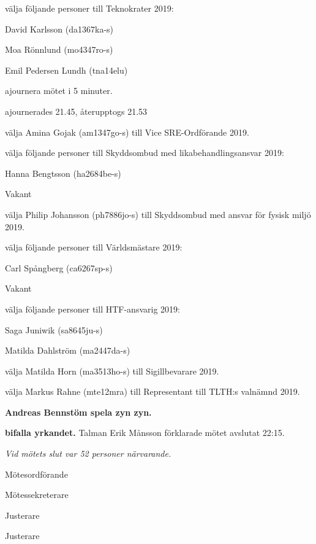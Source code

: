 \documentclass[10pt]{article}
\def\mo{Erik Månsson}
\def\ms{Axel Voss}
\def\ji{Rasmus Sobel}
\def\jii{Henrik Ramström}
\begin{document}
\begin{paragrafer}
\begin{paralist}
    \Mba välja följande personer till Teknokrater 2019:
    \begin{tightdashlist}
        \item David Karlsson (da1367ka-s)
        \item Moa Rönnlund (mo4347ro-s)
        \item Emil Pedersen Lundh (tna14elu)
    \end{tightdashlist}

    \Mba ajournera mötet i 5 minuter. 

    \Mba ajournerades 21.45, återupptogs 21.53
    
    \Mba välja Amina Gojak (am1347go-s) till Vice SRE-Ordförande 2019.

    \Mba välja följande personer till Skyddsombud med likabehandlingsansvar 2019:
    \begin{tightdashlist}
        \item Hanna Bengtsson (ha2684be-s)
        \item Vakant
    \end{tightdashlist}

    \Mba välja Philip Johansson (ph7886jo-s) till Skyddsombud med ansvar för fysisk miljö 2019.

    \Mba välja följande personer till Världsmästare 2019:
    \begin{tightdashlist}
        \item Carl Spångberg (ca6267sp-s)
        \item Vakant
    \end{tightdashlist}
\newpage
    \Mba välja följande personer till HTF-ansvarig 2019:
    \begin{tightdashlist}
        \item Saga Juniwik (sa8645ju-s)
        \item Matilda Dahlström (ma2447da-s)
    \end{tightdashlist}

    \Mba välja Matilda Horn (ma3513ho-s) till Sigillbevarare 2019.
    

    \Mba välja Markus Rahne (mte12mra) till Representant till TLTH:s valnämnd 2019.

\end{paralist}

\textbf{Andreas Bennstöm \ypa spela zyn zyn.}

\textbf{\Mba bifalla yrkandet.}
Talman {\mo} förklarade mötet avslutat 22:15.

\emph{Vid mötets slut var 52 personer närvarande.}

\end{paragrafer}

\newpage
\hidesignfoot
\begin{signatures}{4}
\signature{\mo}{Mötesordförande}
\signature{\ms}{Mötessekreterare}
\signature{\ji}{Justerare}
\signature{\jii}{Justerare}
\end{signatures}
\end{document}
